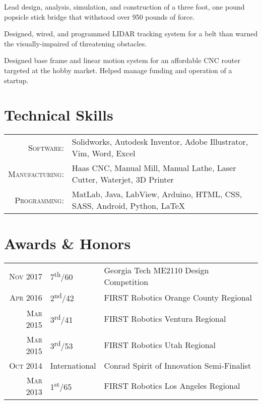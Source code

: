 \documentclass{resume}
\begin{document}
Lead design, analysis, simulation, and construction of a three foot, one pound popsicle stick bridge that withstood over 950 pounds of force.


Designed, wired, and programmed LIDAR tracking system for a belt than warned the visually-impaired of threatening obstacles.

Designed base frame and linear motion system for an affordable CNC router targeted at the hobby market. Helped manage funding and operation of a startup.

\section{Technical Skills}
\begin{tabular}{rl}
  \textsc{Software:}   & Solidworks, Autodesk Inventor, Adobe Illustrator, Vim, Word, Excel\\
  \textsc{Manufacturing:}   & Haas CNC, Manual Mill, Manual Lathe, Laser Cutter, Waterjet, 3D Printer\\
  \textsc{Programming:}  & MatLab, Java, LabView, Arduino, HTML, CSS, SASS, Android, Python, \LaTeX\\
\end{tabular}

\section{Awards \& Honors}
\begin{tabular}{rll}
  \textsc{Nov} 2017 & 7\textsuperscript{th}/60 & Georgia Tech ME2110 Design Competition\\
  \textsc{Apr} 2016 & 2\textsuperscript{nd}/42 & FIRST Robotics Orange County Regional\\
  \textsc{Mar} 2015 & 3\textsuperscript{rd}/41 & FIRST Robotics Ventura Regional\\
  \textsc{Mar} 2015 & 3\textsuperscript{rd}/53 & FIRST Robotics Utah Regional\\
  \textsc{Oct} 2014 & International & Conrad Spirit of Innovation Semi-Finalist\\
  \textsc{Mar} 2013 & 1\textsuperscript{st}/65 & FIRST Robotics Los Angeles Regional\\
\end{tabular}
\end{document}
